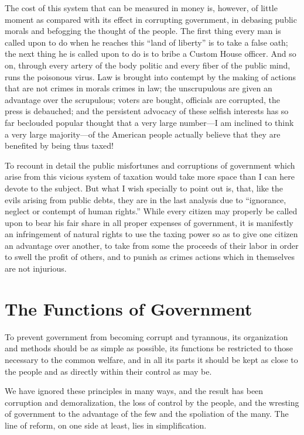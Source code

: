 \documentclass{book}
\begin{document}
The cost of this system that can be measured in money is, however, of little moment as compared with its effect in corrupting government, in debasing public morals and befogging the thought of the people. The first thing every man is called upon to do when he reaches this “land of liberty” is to take a false oath; the next thing he is called upon to do is to bribe a Custom House officer. And so on, through every artery of the body politic and every fiber of the public mind, runs the poisonous virus. Law is brought into contempt by the making of actions that are not crimes in morals crimes in law; the unscrupulous are given an advantage over the scrupulous; voters are bought, officials are corrupted, the press is debauched; and the persistent advocacy of these selfish interests has so far beclouded popular thought that a very large number—I am inclined to think a very large majority—of the American people actually believe that they are benefited by being thus taxed!

To recount in detail the public misfortunes and corruptions of government which arise from this vicious system of taxation would take more space than I can here devote to the subject. But what I wish specially to point out is, that, like the evils arising from public debts, they are in the last analysis due to “ignorance, neglect or contempt of human rights.” While every citizen may properly be called upon to bear his fair share in all proper expenses of government, it is manifestly an infringement of natural rights to use the taxing power so as to give one citizen an advantage over another, to take from some the proceeds of their labor in order to swell the profit of others, and to punish as crimes actions which in themselves are not injurious.

\chapter{The Functions of Government}
\label{chapter-17}
To prevent government from becoming corrupt and tyrannous, its organization and methods should be as simple as possible, its functions be restricted to those necessary to the common welfare, and in all its parts it should be kept as close to the people and as directly within their control as may be.

We have ignored these principles in many ways, and the result has been corruption and demoralization, the loss of control by the people, and the wresting of government to the advantage of the few and the spoliation of the many. The line of reform, on one side at least, lies in simplification.
\end{document}
